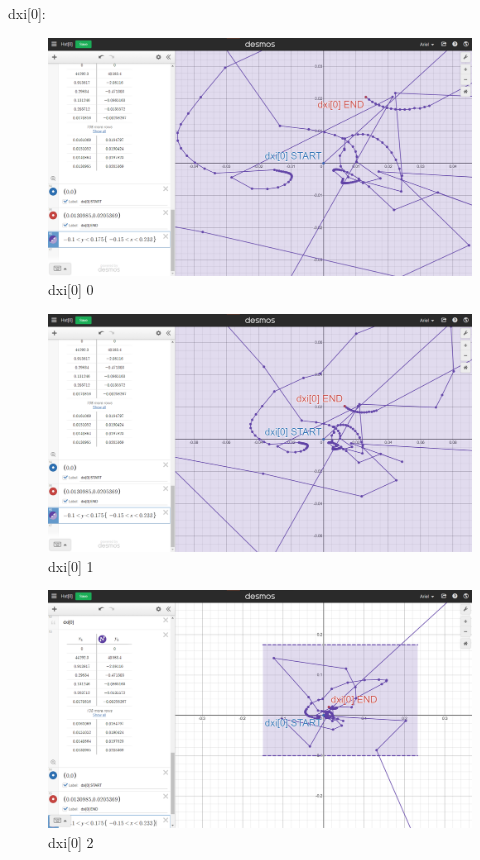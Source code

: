 dxi[0]:
\begin{figure}[H]
    \includegraphics[width=\columnwidth]{figs/dxi[0]_0}
    \caption{dxi[0] 0}
\end{figure}
\begin{figure}[H]
    \includegraphics[width=\columnwidth]{figs/dxi[0]_1}
    \caption{dxi[0] 1}
\end{figure}
\begin{figure}[H]
    \includegraphics[width=\columnwidth]{figs/dxi[0]_2}
    \caption{dxi[0] 2}
\end{figure}
